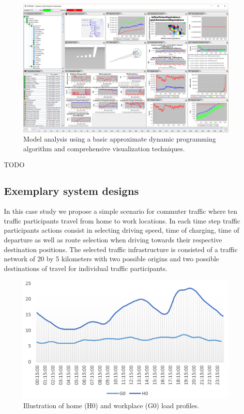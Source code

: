 \begin{figure}[h]
	\includegraphics[width=\columnwidth]{./gfx/analysis.png}
	\caption{Model analysis using a basic approximate dynamic programming algorithm and comprehensive visualization techniques.}
	\label{figure:analysis}
\end{figure}

TODO

\subsection{Exemplary system designs}
\label{examples}

In this case study we propose a simple scenario for commuter traffic where ten traffic participants travel from home to work locations. In each time step traffic participants actions consist in selecting driving speed, time of charging, time of departure as well as route selection when driving towards their respective destination positions. The selected traffic infrastructure is consisted of a traffic network of 20 by 5 kilometers with two possible origins and two possible destinations of travel for individual traffic participants. 

\begin{figure}
	\centering
	\includegraphics[width=\columnwidth]{gfx/profiles.PNG}
	\caption{Illustration of home (H0) and workplace (G0) load profiles.}
	\label{profiles}
\end{figure}

